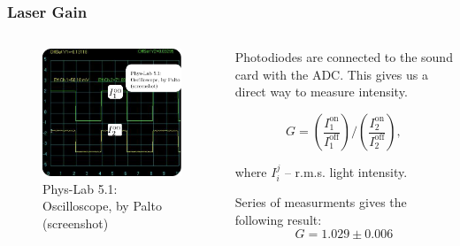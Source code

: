 \documentclass{beamer}
\begin{document}
	\begin{frame}
		\frametitle{Laser Gain}
		
		
		\begin{columns}
			\begin{column}{0.4\textwidth}
				\begin{figure}
					\centering
					\includegraphics[width=1\linewidth]{res/oscilloscope.png}
					\caption{Phys-Lab 5.1: Oscilloscope, by Palto (screenshot)}
				\end{figure}
			\end{column}
			\begin{column}{0.6\textwidth}
				Photodiodes are connected to the sound card with the ADC. This gives us a direct way to measure intensity. 
				
				$$G = \left(\frac{I^{\text{on}}_{1}}{I^{\text{off}}_{1}}\right)/\left(\frac{I^{\text{on}}_{2}}{I^{\text{off}}_{2}}\right),$$
				
				where $I_i^j$ -- r.m.s. light intensity.
				
				Series of measurments gives the following result:
				$$G = 1.029 \pm 0.006$$
			\end{column}
		\end{columns}
		
	\end{frame}
	
\end{document}
